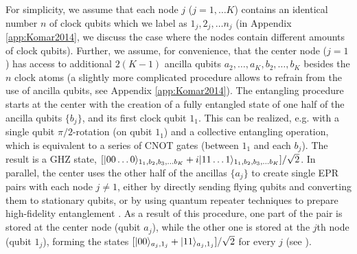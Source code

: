 For simplicity, we assume that each node $j$ ($j=1,\dots K$) contains an
identical number $n$ of clock qubits which we label as $1_j, 2_j,\dots n_j$ (in
Appendix \ref{app:Komar2014}, we discuss the case where the nodes contain
different amounts of clock qubits).
Further, we assume, for convenience, that the center node ($j=1$) has access to
additional $2(K-1)$ ancilla qubits $a_2,\dots, a_K,b_2,\dots,b_K$ besides the
$n$ clock atoms (a slightly more complicated procedure allows to refrain from
the use of ancilla qubits, see Appendix \ref{app:Komar2014}).
The entangling procedure starts at the center with the creation of a fully
entangled state of one half of the ancilla qubits $\{b_j\}$, and its first clock
qubit $1_1$. 
This can be realized, e.g.  with a single qubit $\pi/2$-rotation
(on qubit $1_1$)
and a collective entangling operation, which is equivalent to a series of
CNOT gates \cite{Nielsen_Chuang} (between $1_1$ and each $b_j$).
The result is a GHZ state, $[| 00\dots 0 \rangle_{1_1,b_2,b_3,\dots b_K} +
i| 11\dots 1 \rangle_{1_1,b_2,b_3,\dots b_K}]/\sqrt{2}$.
In parallel, the center uses the other half of the ancillas $\{a_j\}$ to create single EPR pairs with each node $j\neq1$,
either by directly sending flying qubits and converting them to stationary
qubits, or by using quantum repeater techniques to prepare high-fidelity entanglement \cite{duan3}. As a result of this procedure, 
one part of the pair is stored at the center node (qubit $a_j$), while the other one
is stored at the $j$th  node (qubit $1_j$), forming the states $[| 00 \rangle_{a_j,1_j} +
| 11 \rangle_{a_j,1_j}]/\sqrt{2}$ for every $j$ (see ).
